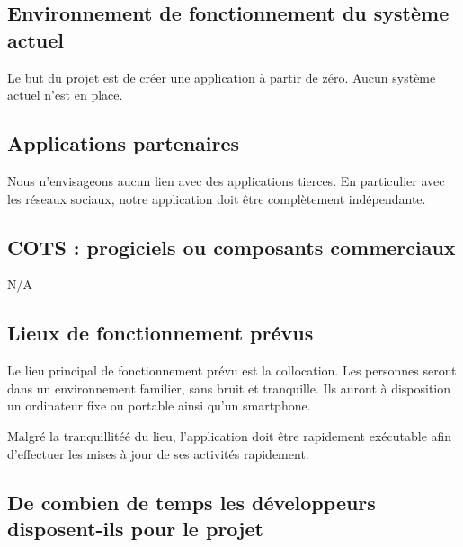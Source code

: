 
\subsection{Environnement de fonctionnement du système actuel} %
\label{sub:environnement_de_fonctionnement_du_syst_me_actuel}

	Le but du projet est de créer une application à partir de zéro. Aucun système actuel n'est en place.


\subsection{Applications partenaires} %
\label{sub:applications_partenaires}

	Nous n'envisageons aucun lien avec des applications tierces. En particulier avec les réseaux sociaux, notre application doit être complètement indépendante.


\subsection{COTS : progiciels ou composants commerciaux} %
\label{sub:cots_progiciels_ou_composants_commerciaux}

	N/A


\subsection{Lieux de fonctionnement prévus} %
\label{sub:lieux_de_fonctionnement_pr_vus}

	Le lieu principal de fonctionnement prévu est la collocation. Les personnes seront dans un environnement familier, sans bruit et tranquille. Ils auront à disposition un ordinateur fixe ou portable ainsi qu'un smartphone.

	Malgré la tranquillitéé du lieu, l'application doit être rapidement exécutable afin d'effectuer les mises à jour de ses activités rapidement.


\subsection{De combien de temps les développeurs disposent-ils pour le projet} %
\label{sub:de_combien_de_temps_les_d_veloppeurs_disposent_ils_pour_le_projet}

